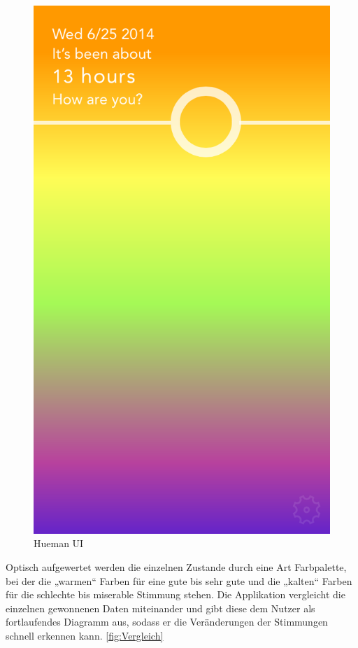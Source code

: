 \begin{figure}[H]
	\centering
	\includegraphics[scale=0.3]{images/hueman-app-main-ui.PNG}
	\caption{Hueman UI \cite{fig:HUI}}
	\label{fig:HUI}
\end{figure}

Optisch aufgewertet werden die einzelnen Zustande durch eine Art Farbpalette, bei der die „warmen“ Farben für eine gute bis sehr gute und die „kalten“ Farben für die schlechte bis miserable Stimmung stehen. \cite{web:Human}
Die Applikation vergleicht die einzelnen gewonnenen Daten miteinander und gibt diese dem Nutzer als fortlaufendes Diagramm aus, sodass er die Veränderungen der Stimmungen schnell erkennen kann.
\ref{fig:Vergleich}

